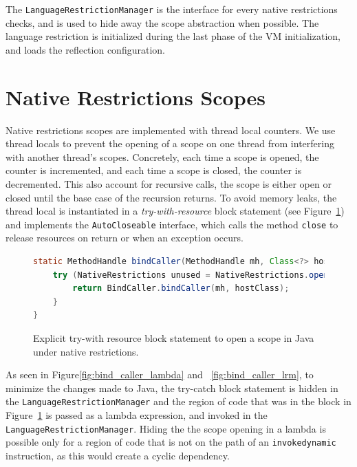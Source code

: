 The \verb|LanguageRestrictionManager| is the interface for every native restrictions checks, and is used to hide away the scope abstraction when possible.
The language restriction is initialized during the last phase of the VM initialization, and loads the reflection configuration.
\section{Native Restrictions Scopes}
Native restrictions scopes are implemented with thread local counters. We use thread locals to prevent the opening of a scope on one thread from interfering with another thread's scopes.
Concretely, each time a scope is opened, the counter is incremented, and each time a scope is closed, the counter is decremented. This also account for recursive calls, the scope is either open or closed until the base case of the recursion returns.
To avoid memory leaks, the thread local is instantiated in a \emph{try-with-resource} block statement (see Figure~\ref{fig:bind_caller_twr}) and implements the \verb|AutoCloseable| interface, which calls the method \verb|close| to release resources on return or when an exception occurs.

\begin{figure}[ht]
    \centering
\begin{lstlisting}[language=Java]
static MethodHandle bindCaller(MethodHandle mh, Class<?> hostClass) {
    try (NativeRestrictions unused = NativeRestrictions.openScope()) {
        return BindCaller.bindCaller(mh, hostClass);
    }
}
\end{lstlisting}
    \caption{Explicit try-with resource block statement to open a scope in Java under native restrictions.}
    \label{fig:bind_caller_twr}
\end{figure}

As seen in Figure\ref{fig:bind_caller_lambda} and ~\ref{fig:bind_caller_lrm}, to minimize the changes made to Java, the try-catch block statement is hidden in the \verb|LanguageRestrictionManager| and the region of code that was in the block in Figure~\ref{fig:bind_caller_twr} is passed as a lambda expression, and invoked in the \verb|LanguageRestrictionManager|. Hiding the the scope opening in a lambda is possible only for a region of code that is not on the path of an \verb|invokedynamic| instruction, as this would create a cyclic dependency. 

